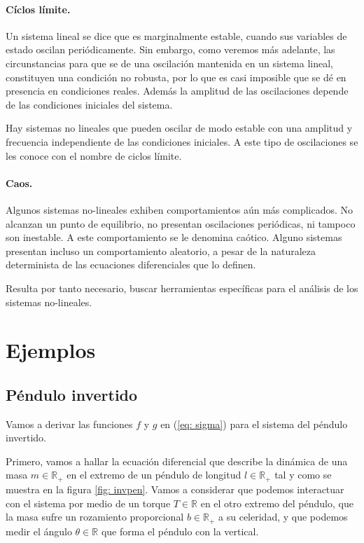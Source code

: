 \paragraph{Cíclos límite.} Un sistema lineal se dice que es marginalmente estable, cuando sus variables de estado oscilan periódicamente. Sin embargo, como veremos más adelante, las circunstancias para que se de una oscilación mantenida en un sistema lineal, constituyen una condición no robusta, por lo que es casi imposible que se dé en presencia en condiciones reales. Además la amplitud de las oscilaciones depende de las condiciones iniciales del sistema.

Hay sistemas no lineales que pueden oscilar de modo estable con una amplitud y frecuencia independiente de las condiciones iniciales. A este tipo de oscilaciones se les conoce con el nombre de ciclos límite. 

\paragraph{Caos.} Algunos sistemas no-lineales exhiben comportamientos aún más complicados. No alcanzan un punto de equilibrio, no presentan oscilaciones periódicas, ni tampoco son inestable. A este comportamiento se le denomina caótico. Alguno sistemas presentan incluso un comportamiento aleatorio, a pesar de la naturaleza determinista de las ecuaciones diferenciales que lo definen.


 Resulta por tanto necesario, buscar herramientas específicas para el análisis de los sistemas no-lineales.
\section{Ejemplos} \label{sec: ejem}
\subsection{Péndulo invertido}

Vamos a derivar las funciones $f$ y $g$ en (\ref{eq: sigma}) para el sistema del péndulo invertido.

Primero, vamos a hallar la ecuación diferencial que describe la dinámica de una masa $m\in\mathbb{R}_+$ en el extremo de un péndulo de longitud $l\in\mathbb{R}_+$ tal y como se muestra en la figura \ref{fig: invpen}. Vamos a considerar que podemos interactuar con el sistema por medio de un torque $T\in\mathbb{R}$ en el otro extremo del péndulo, que la masa sufre un rozamiento proporcional $b\in\mathbb{R}_+$ a su celeridad, y que podemos medir el ángulo $\theta\in\mathbb{R}$ que forma el péndulo con la vertical.

